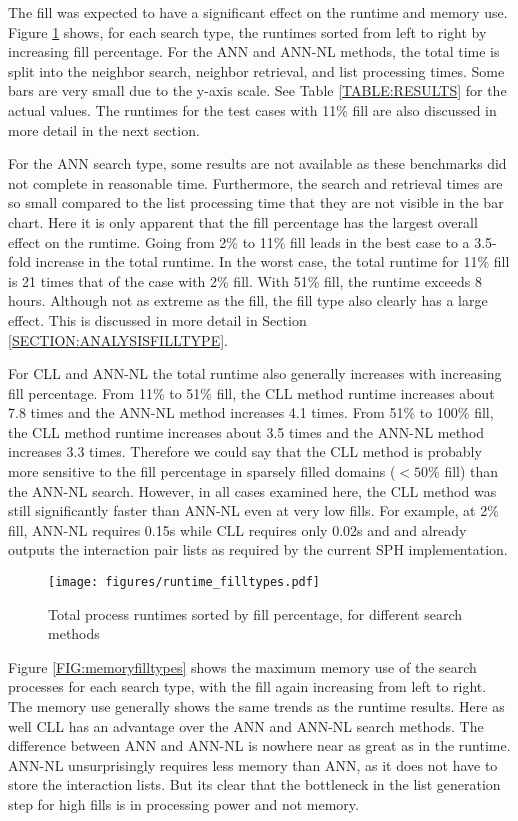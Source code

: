 The fill was expected to have a significant effect on the runtime and memory use. Figure \ref{FIG:runtimefilltypes} shows, for each search type, the runtimes sorted from left to right by increasing fill percentage. For the ANN and ANN-NL methods, the total time is split into the neighbor search, neighbor retrieval, and list processing times. Some bars are very small due to the y-axis scale. See Table \ref{TABLE:RESULTS} for the actual values. The runtimes for the test cases with 11\% fill are also discussed in more detail in the next section. 

For the ANN search type, some results are not available as these benchmarks did not complete in reasonable time. Furthermore, the search and retrieval times are so small compared to the list processing time that they are not visible in the bar chart. Here it is only apparent that the fill percentage has the largest overall effect on the runtime. Going from 2\% to 11\% fill leads in the best case to a 3.5-fold increase in the total runtime. In the worst case, the total runtime for 11\% fill is 21 times that of the case with 2\% fill. With 51\% fill, the runtime exceeds 8 hours. Although not as extreme as the fill, the fill type also clearly has a large effect. This is discussed in more detail in Section \ref{SECTION:ANALYSISFILLTYPE}.

For CLL and ANN-NL the total runtime also generally increases with increasing fill percentage. From 11\% to 51\% fill, the CLL method runtime increases about 7.8 times and the ANN-NL method increases 4.1 times. From 51\% to 100\% fill, the CLL method runtime increases about 3.5 times and the ANN-NL method increases 3.3 times. Therefore we could say that the CLL method is probably more sensitive to the fill percentage in sparsely filled domains ($< 50\%$ fill) than the ANN-NL search. However, in all cases examined here, the CLL method was still significantly faster than ANN-NL even at very low fills. For example, at 2\% fill, ANN-NL requires 0.15s while CLL requires only 0.02s and and already outputs the interaction pair lists as required by the current SPH implementation.

\begin{figure}[h]
	\centering
	\texttt{[image: figures/runtime\_filltypes.pdf]}
	\caption{Total process runtimes sorted by fill percentage, for different search methods} 
	\label{FIG:runtimefilltypes}
\end{figure}

Figure \ref{FIG:memoryfilltypes} shows the maximum memory use of the search processes for each search type, with the fill again increasing from left to right. The memory use generally shows the same trends as the runtime results. Here as well CLL has an advantage over the ANN and ANN-NL search methods. The difference between ANN and ANN-NL is nowhere near as great as in the runtime. ANN-NL unsurprisingly requires less memory than ANN, as it does not have to store the interaction lists. But its clear that the bottleneck in the list generation step for high fills is in processing power and not memory.

